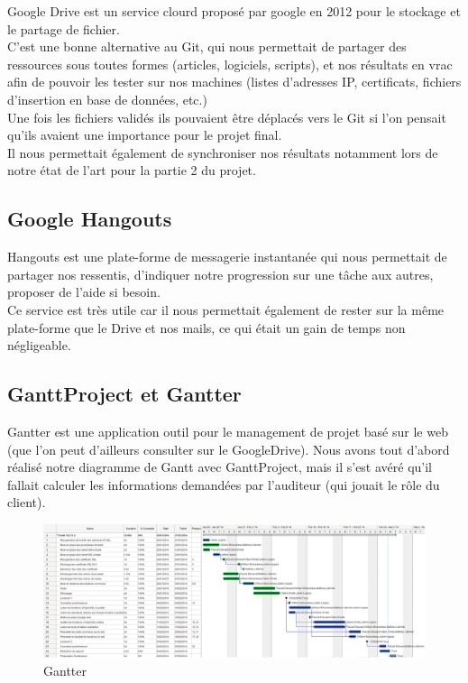 Google Drive est un service clourd proposé par google en 2012 pour le stockage et le partage de fichier.\\
C'est une bonne alternative au Git, qui nous permettait de partager des ressources sous toutes formes (articles, logiciels, scripts), et nos résultats en vrac afin de pouvoir les tester sur nos machines (listes d'adresses IP, certificats, fichiers d'insertion en base de données, etc.)\\
Une fois les fichiers validés ils pouvaient être déplacés vers le Git si l'on pensait qu'ils avaient une importance pour le projet final.\\
Il nous permettait également de synchroniser nos résultats notamment lors de notre état de l'art pour la partie 2 du projet.

\subsection{Google Hangouts}

Hangouts est une plate-forme de messagerie instantanée qui nous permettait de partager nos ressentis, d'indiquer notre progression sur une tâche aux autres, proposer de l'aide si besoin.\\
Ce service est très utile car il nous permettait également de rester sur la même plate-forme que le Drive et nos mails, ce qui était un gain de temps non négligeable.

\subsection{GanttProject et Gantter}

Gantter \cite{gantter} est une application outil pour le management de projet basé sur le web (que l'on peut d'ailleurs consulter sur le GoogleDrive).
Nous avons tout d'abord réalisé notre diagramme de Gantt avec GanttProject, mais il s'est avéré qu'il fallait calculer les informations demandées par l'auditeur (qui jouait le rôle du client).\\

\begin{figure}[H]
\begin{center}
\includegraphics[scale=0.28]{images/projet_gantter.png}
\end{center}
\caption{Gantter}
\label{gantter}
\end{figure}

